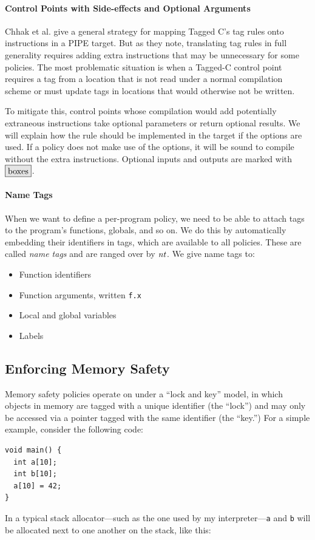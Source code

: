 \documentclass[acmsmall,review,anonymous]{acmart}\settopmatter{printfolios=true,printccs=false,printacmref=false}
\begin{document}
\paragraph*{Control Points with Side-effects and Optional Arguments}

Chhak et al. \cite{Chhak21:Tagine} give a general strategy for mapping Tagged C's tag rules
onto instructions in a PIPE target. But as they note, translating tag rules in full generality
requires adding extra instructions that may be unnecessary for some policies. The most problematic
situation is when a Tagged-C control point requires a tag from a location that is not read under
a normal compilation scheme or must update tags in locations that would otherwise not be written.

To mitigate this, control points whose compilation would add potentially extraneous instructions
take optional parameters or return optional results. We will explain how the rule should be
implemented in the target if the options are used. If a policy does not make use of the options, it will
be sound to compile without the extra instructions. Optional inputs
and outputs are marked with \(\optional{boxes}\).

\paragraph*{Name Tags}

When we want to define a per-program policy, we need to be able to attach tags to the program's
functions, globals, and so on. We do this by automatically embedding their identifiers in tags,
which are available to all policies. These are called {\em name tags} and are ranged over by
\(\mathit{nt}\). We give name tags to:
\begin{itemize}
\item Function identifiers
\item Function arguments, written {\tt f.x}
\item Local and global variables
\item Labels
\end{itemize}

\subsection{Enforcing Memory Safety}
\label{sec:memsafe}

Memory safety policies operate on under a ``lock and key'' model, in which objects in memory
are tagged with a unique identifier (the ``lock'') and may only be accessed via a pointer tagged
with the same identifier (the ``key.'') For a simple example, consider the following code:
%
\vspace{\abovedisplayskip}
\begin{verbatim}
void main() {
  int a[10];
  int b[10];
  a[10] = 42;    
}
\end{verbatim}
\vspace{\belowdisplayskip}
%
In a typical stack allocator---such as the one used by my interpreter---{\tt a} and {\tt b} will
be allocated next to one another on the stack, like this:
\end{document}
